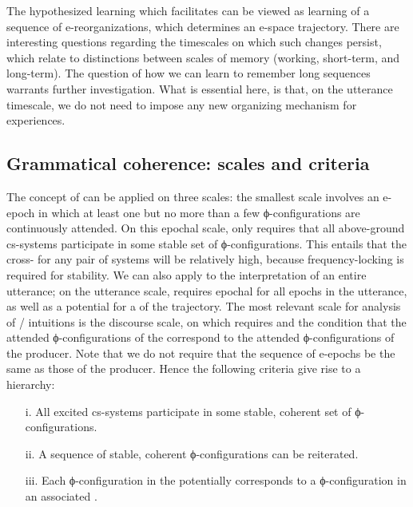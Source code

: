   The hypothesized learning which  facilitates can be viewed as learning of a sequence of e-reorganizations, which determines an e-space trajectory. There are interesting questions regarding the timescales on which such changes persist, which relate to distinctions between scales of memory (working, short-term, and long-term). The question of how we can learn to remember long sequences warrants further investigation. What is essential here, is that, on the utterance timescale, we do not need to impose any new organizing mechanism for  experiences. 

\subsection{Grammatical coherence: scales and criteria}

The concept of  can be applied on three scales: the smallest scale involves an e-epoch in which at least one but no more than a few ϕ-configurations are continuously attended. On this epochal scale,  only requires that all above-ground cs-systems participate in some stable set of ϕ-configurations. This entails that the cross- for any pair of systems will be relatively high, because frequency-locking is required for stability. We can also apply  to the interpretation of an entire utterance; on the utterance scale,  requires epochal  for all epochs in the utterance, as well as a potential for a  of the trajectory. The most relevant scale for analysis of / intuitions is the discourse scale, on which  requires  and the condition that the attended ϕ-configurations of the  correspond to the attended ϕ-configurations of the producer. Note that we do not require that the sequence of  e-epochs be the same as those of the producer. Hence the following criteria give rise to a  hierarchy:

\begin{itemize}
\item[i.] 
All excited cs-systems participate in some stable, coherent set of ϕ-configurations.
\item[ii.] 
A sequence of stable, coherent ϕ-configurations can be reiterated.
\item[iii.] 
Each ϕ-configuration in the potentially   corresponds to a ϕ-configuration in an associated .
\end{itemize}

